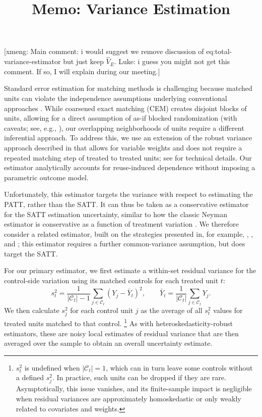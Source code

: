 \documentclass[11pt]{article}
\title{Memo: Variance Estimation}
\author{}
\date{}
\newcommand{\xmeng}[1]{
  {\color{blue} [xmeng: {#1}]}
 }
\newcommand{\Ct}{\mathcal{C}_t}
\begin{document}
\maketitle

\xmeng{Main comment: i would suggest we remove discussion of {eq:total-variance-estimator} but just keep $\hat{V}_E$. Luke: i guess you might not get this comment. If so, I will explain during our meeting.}

Standard error estimation for matching methods is challenging because matched units can violate the independence assumptions underlying conventional approaches \citep{abadie2006large}.
While coarsened exact matching (CEM) creates disjoint blocks of units, allowing for a direct assumption of as-if blocked randomization (with caveats; see, e.g., \citealp{pashley2021conditional}), our overlapping neighborhoods of units require a different inferential approach.
To address this, we use an extension of the robust variance approach described in \citet{abadie2006large} that allows for variable weights and does not require a repeated matching step of treated to treated units; see \cite{meng2025varianceestimationmatchingreweighting} for technical details.
Our estimator analytically accounts for reuse-induced dependence without imposing a parametric outcome model.

Unfortunately, this estimator targets the variance with respect to estimating the PATT, rather than the SATT.
It can thus be taken as a conservative estimator for the SATT estimation uncertainty, similar to how the classic Neyman estimator is conservative as a function of treatment variation \citep{ding2017bridging}.
We therefore consider a related estimator, built on the strategies presented in, for example, \citet{ben2021augmented}, \citet{keele2023hospital}, and \citet{lu2023you}; this estimator requires a further common-variance assumption, but does target the SATT.



For our primary estimator, we first estimate a within-set residual variance for the control-side variation using its matched controls for each treated unit $t$:
\[
s_t^2
= \frac{1}{|\Ct|-1}\sum_{j\in\Ct}\left(Y_j-\bar{Y}_t\right)^2,
\qquad
\bar{Y}_t=\frac{1}{|\Ct|}\sum_{j\in\Ct}Y_j.
\]
We then calculate $s_j^2$ for each control unit $j$ as the average of all $s_t^2$ values for treated units matched to that control.
\footnote{$s_t^2$ is undefined when $|\Ct|=1$, which can in turn leave some controls without a defined $s_j^2$. In practice, such units can be dropped if they are rare. Asymptotically, this issue vanishes, and its finite-sample impact is negligible when residual variances are approximately homoskedastic or only weakly related to covariates and weights.}
As with heteroskedasticity-robust estimators, these are noisy local estimates of residual variance that are then averaged over the sample to obtain an overall uncertainty estimate.
\end{document}
